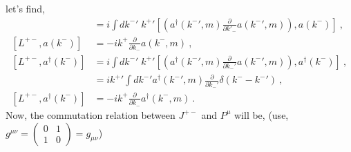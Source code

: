 \documentclass[12pt,a4paper]{report}
\begin{document}
let's find, 
  \begin{align}
      [L^{+-}, a(k^-)]&=i\int dk^-' \;k^+' \left[\left (a^{\dagger}(k^-',m)\frac{\partial}{\partial k'_-}a(k^-',m)\right), a(k^-)\right]\nonumber~,\\
      [L^{+-}, a(k^-)]&=-ik^+ \frac{\partial}{\partial k_-}a(k^-,m)\nonumber~,\\
      [L^{+-}, a^{\dagger}(k^-)]&=i\int dk^-' \;k^+' \left[\left (a^{\dagger}(k^-',m)\frac{\partial}{\partial k_-'}a(k^-',m)\right), a^{\dagger}(k^-)\right]\nonumber~,\\
      &=ik^+'\int dk^-' a^{\dagger}(k^-',m) \frac{\partial}{\partial k_-'}\delta(k^--k^-')\nonumber~,\\
      [L^{+-}, a^{\dagger}(k^-)]&=-ik^+\frac{\partial}{\partial k_-}a^{\dagger}(k^-,m)\nonumber~.
  \end{align}
Now, the commutation relation between $J^{+-}$ and $P^\mu$ will be, (use, $g^{\mu\nu}=\begin{pmatrix}
  0 & 1\\ 
  1 & 0
\end{pmatrix}=g_{\mu\nu}$)
\end{document}
